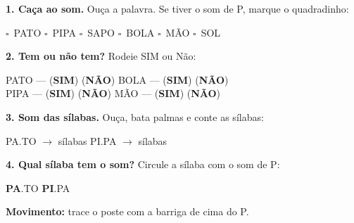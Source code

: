 \begin{somletra}
\textbf{1. Ca\c{c}a ao som.} Ou\c{c}a a palavra. Se tiver o som de P, marque o quadradinho:
\begin{center}
$\square$~PATO \quad $\square$~PIPA \quad $\square$~SAPO \quad $\square$~BOLA \quad $\square$~M\~AO \quad $\square$~SOL
\end{center}

\textbf{2. Tem ou n\~ao{} tem?} Rodeie SIM ou N\~ao:
\begin{center}
PATO --- (\textbf{SIM}) (\textbf{N\~AO}) \quad BOLA --- (\textbf{SIM}) (\textbf{N\~AO}) \\ PIPA --- (\textbf{SIM}) (\textbf{N\~AO}) \quad M\~AO --- (\textbf{SIM}) (\textbf{N\~AO})
\end{center}
\end{somletra}

\begin{somsilaba}
\textbf{3. Som das s\'ilabas.} Ou\c{c}a, bata palmas e conte as s\'ilabas:
\begin{center}
PA.TO $\rightarrow$ \underline{\hspace{1cm}} s\'ilabas \quad PI.PA $\rightarrow$ \underline{\hspace{1cm}} s\'ilabas
\end{center}

\textbf{4. Qual s\'ilaba tem o som?} Circule a s\'ilaba com o som de P:
\begin{center}
\textbf{PA}.TO \quad \textbf{PI}.PA
\end{center}
\end{somsilaba}



\begin{motricidade}
\textbf{Movimento:} trace o poste com a barriga de cima do P.
\begin{center}
\end{center}
\end{motricidade}

